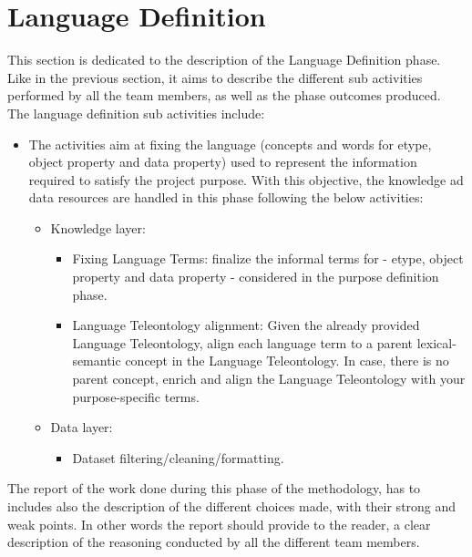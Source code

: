 \section{Language Definition}

This section is dedicated to the description of the Language Definition phase. Like in the previous section, it aims to describe the different sub activities performed by all the team members, as well as the phase outcomes produced. The language definition sub activities include:
\begin{itemize}
    \item The activities aim at fixing the language (concepts and words for etype, object property and data property) used to represent the information required to satisfy the project purpose. With this objective, the knowledge ad data resources are handled in this phase following the below activities:
    \begin{itemize}
        \item Knowledge layer:
        \begin{itemize}
            \item Fixing Language Terms: finalize the informal terms for - etype, object property and data property - considered in the purpose definition phase.
            \item Language Teleontology alignment: Given the already provided Language Teleontology, align each language term to a parent lexical-semantic concept in the Language Teleontology. In case, there is no parent concept, enrich and align the Language Teleontology with your purpose-specific terms.
        \end{itemize}
        \item Data layer:
        \begin{itemize}
            \item Dataset filtering/cleaning/formatting.
        \end{itemize}
    \end{itemize}
\end{itemize}

\noindent The report of the work done during this phase of the methodology, has to includes also the description of the  different choices made, with their strong and weak points. In other words the report should provide to the reader, a clear description of the reasoning conducted by all the different team members.

